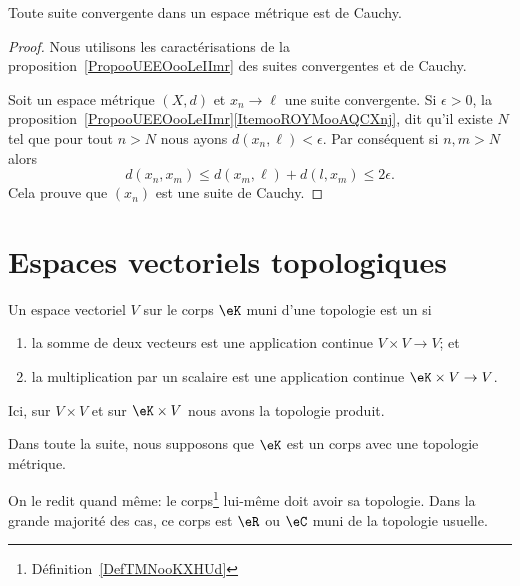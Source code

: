 \begin{proposition}     \label{PROPooZZNWooHghltd}
    Toute suite convergente dans un espace métrique est de Cauchy.
\end{proposition}

\begin{proof}
    Nous utilisons les caractérisations de la proposition~\ref{PropooUEEOooLeIImr} des suites convergentes et de Cauchy.

    Soit un espace métrique \( (X,d)\) et \( x_n\to\ell\) une suite convergente. Si \( \epsilon>0\), la proposition~\ref{PropooUEEOooLeIImr}\ref{ItemooROYMooAQCXnj}, dit qu'il existe \( N\) tel que pour tout \( n>N\) nous ayons \( d(x_n,\ell)<\epsilon\). Par conséquent si \( n,m>N\) alors
    \begin{equation}
        d(x_n,x_m)\leq d(x_m,\ell)+d(l,x_m)\leq 2\epsilon.
    \end{equation}
    Cela prouve que \( (x_n)\) est une suite de Cauchy.
\end{proof}

\section{Espaces vectoriels topologiques}


\begin{definition}\label{DefEVTopologique}
  Un espace vectoriel \( V\) sur le corps \( \eK\) muni d'une topologie est un  si
    \begin{enumerate}
        \item
            la somme de deux vecteurs est une application continue \( V\times V\to V \); et
        \item
            la multiplication par un scalaire est une application continue \( \eK\times V\to V\).
    \end{enumerate}
    Ici, sur \( V\times V\) et sur \( \eK\times V\) nous avons la topologie produit.

    Dans toute la suite, nous supposons que \( \eK\) est un corps avec une topologie métrique.
\end{definition}
On le redit quand même: le corps\footnote{Définition~\ref{DefTMNooKXHUd}} lui-même doit avoir sa topologie. Dans la grande majorité des cas, ce corps est \( \eR\) ou \( \eC\) muni de la topologie usuelle.

